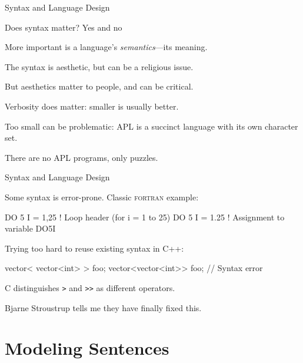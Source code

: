 \documentclass{plt}
\begin{document}
\begin{frame}[fragile]{Syntax and Language Design}

Does syntax matter?  Yes and no

More important is a language's \emph{semantics}---its meaning.

The syntax is aesthetic, but can be a religious issue.

But aesthetics matter to people, and can be critical.

Verbosity does matter: smaller is usually better.

Too small can be problematic: APL is a succinct language with its
own character set.

There are no APL programs, only puzzles.

\end{frame}

\begin{frame}[fragile]{Syntax and Language Design}

Some syntax is error-prone.  Classic \textsc{fortran} example:

\begin{fortran}
DO 5 I = 1,25  ! Loop header (for i = 1 to 25)
DO 5 I = 1.25  ! Assignment to variable DO5I
\end{fortran}

Trying too hard to reuse existing syntax in C++:

\begin{cpp}
vector< vector<int> > foo;
vector<vector<int>> foo; // Syntax error
\end{cpp}

C distinguishes \verb|>| and \verb|>>| as different operators.

Bjarne Stroustrup tells me they have finally fixed this.

\end{frame}

\part{Modeling Sentences}
\frame{\partpage}
\end{document}
